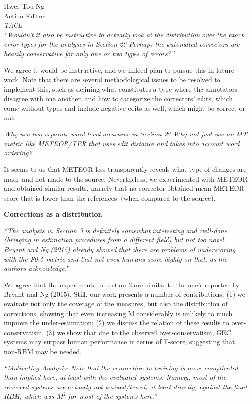 \documentclass[11pt,letterpaper]{letter}
\begin{document}
\begin{letter}{%
Hwee Tou Ng\\
Action Editor\\
{\em TACL}\\
}
\emph{``Wouldn't it also be instructive to actually look at the distribution
	over the exact error types for the analyses in Section 2? Perhaps the automated correctors are heavily conservative for only one or two types of errors?''
	}
	
We agree it would be instructive, and we indeed plan to pursue this in future work. Note that there are several methodological issues to be resolved to implement this, such as defining what constitutes a type where the annotators disagree with one another, and how to categorize the correctors' edits, {\color{red}which come without types and include negative edits as well, which might be correct or not.}
	
\emph{Why use two separate word-level measures in Section 2? Why not just use
	an MT metric like METEOR/TER that uses edit distance and takes into account
	word ordering?}

It seems to us that METEOR less transparently reveals what type of changes are made and not made to the source. Nevertheless, we experimented with METEOR and obtained similar results, namely that no corrector obtained mean METEOR score that is lower than the references' (when compared to the source).

{\bf Corrections as a distribution}

\emph{``The analysis in Section 3 is definitely somewhat interesting and
	well-done (bringing in estimation procedures from a different field) but not
	too novel. Bryant and Ng (2015) already showed that there are problems of
	underscoring with the F0.5 metric and that not even humans score highly on
	that, as the authors acknowledge.''
	}
	
We agree that the experiments in section 3 are similar to the one's reported by Bryant and Ng (2015). Still, our work presents a number of contributions: (1) we evaluate not only the coverage of the measures, but also the distribution of corrections, showing that even increasing M considerably is unlikely to much improve the under-estimation; (2) we discuss the relation of these results to over-conservatism, (3) we show that due to the observed over-conservatism, GEC systems may surpass human performance in terms of F-score, suggesting that non-RBM may be needed.

\emph{``Motivating Analysis: Note that the connection to training is more
	complicated than implied here, at least with the evaluated systems. Namely,
	most of the reviewed systems are actually not trained/tuned, at least
	directly, against the final RBM, which was $M^2$ for most of the systems here.''
	}
	

\end{letter}
\end{document}
